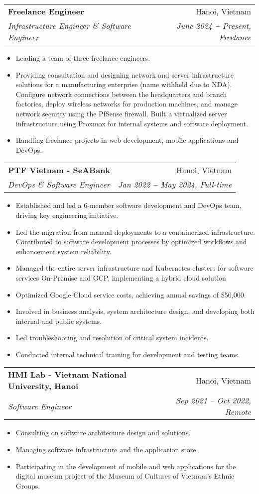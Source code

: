 \documentclass[letterpaper,11pt]{article}
\makeatletter
\newcommand{\resumeItem}[1]{
  \item\small{
    {#1 \vspace{-2pt}}
  }
}
\newcommand{\resumeSubheading}[4]{
  \vspace{-2pt}\item
    \begin{tabular*}{0.97\textwidth}[t]{l@{\extracolsep{\fill}}r}
      \textbf{#1} & #2 \\
      \textit{\small#3} & \textit{\small #4} \\
    \end{tabular*}\vspace{-7pt}
}
\newcommand{\resumeItemListStart}{\begin{itemize}}
\newcommand{\resumeItemListEnd}{\end{itemize}\vspace{-5pt}}
\makeatother
\begin{document}
    \resumeSubheading
      {Freelance Engineer}{Hanoi, Vietnam}
      {Infrastructure Engineer \& Software Engineer}{June 2024 \textbf{--} Present, Freelance}
        \resumeItemListStart
            \resumeItem{Leading a team of three freelance engineers.}
            \resumeItem{Providing consultation and designing network and server infrastructure solutions for a manufacturing enterprise (name withheld due to NDA). Configure network connections between the headquarters and branch factories, deploy wireless networks for production machines, and manage network security using the PfSense firewall. Built a virtualized server infrastructure using Proxmox for internal systems and software deployment.}
            \resumeItem{Handling freelance projects in web development, mobile applications and DevOps.}
        \resumeItemListEnd

    \resumeSubheading
      {PTF Vietnam - SeABank}{Hanoi, Vietnam}
      {DevOps \& Software Engineer}{Jan 2022 \textbf{--} May 2024, Full-time}
        \resumeItemListStart
            \resumeItem{Established and led a 6-member software development and DevOps team, driving key engineering initiative.}
            \resumeItem{Led the migration from manual deployments to a containerized infrastructure. Contributed to software development processes by optimized workflows and enhancement system reliability.}
            \resumeItem{Managed the entire server infrastructure and Kubernetes clusters for software services On-Premise and GCP, implementing a hybrid cloud solution}
            \resumeItem{Optimized Google Cloud service costs, achieving annual savings of \$50,000.}
            \resumeItem{Involved in business analysis, system architecture design, and developing both internal and public systems.}
            \resumeItem{Led troubleshooting and resolution of critical system incidents.}
            \resumeItem{Conducted internal technical training for development and testing teams.}
        \resumeItemListEnd

    \resumeSubheading
      {HMI Lab - Vietnam National University, Hanoi}{Hanoi, Vietnam}
      {Software Engineer}{Sep 2021 -- Oct 2022, Remote}
        \resumeItemListStart
            \resumeItem{Consulting on software architecture design and solutions.}
            \resumeItem{Managing software infrastructure and the application store.}
            \resumeItem{Participating in the development of mobile and web applications for the digital museum project of the Museum of Cultures of Vietnam's Ethnic Groups.}
        \resumeItemListEnd
\end{document}

